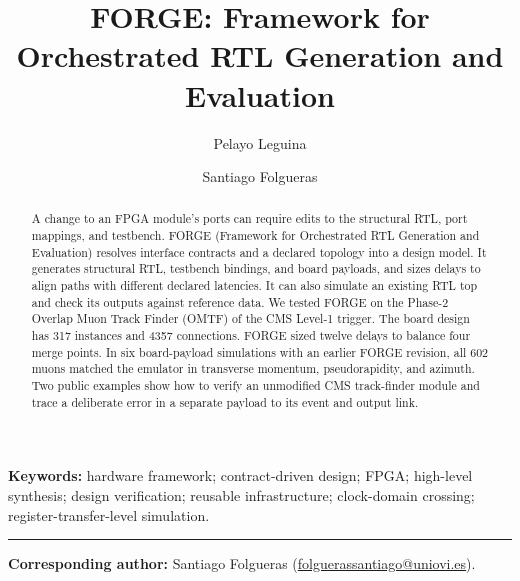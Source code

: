 \documentclass[10pt,a4paper]{article}
\title{\textbf{FORGE:} Framework for Orchestrated RTL Generation and Evaluation}
\author[1]{Pelayo Leguina}
\author[1]{Santiago Folgueras}
\affil[1]{Department of Physics, University of Oviedo, Oviedo, Spain}
\date{}
\begin{document}
\maketitle

\begin{abstract}
A change to an FPGA module's ports can require edits to the structural RTL, port mappings, and testbench. FORGE (Framework for Orchestrated RTL Generation and Evaluation) resolves interface contracts and a declared topology into a design model. It generates structural RTL, testbench bindings, and board payloads, and sizes delays to align paths with different declared latencies. It can also simulate an existing RTL top and check its outputs against reference data. We tested FORGE on the Phase-2 Overlap Muon Track Finder (OMTF) of the CMS Level-1 trigger. The board design has 317 instances and 4357 connections. FORGE sized twelve delays to balance four merge points. In six board-payload simulations with an earlier FORGE revision, all 602 muons matched the emulator in transverse momentum, pseudorapidity, and azimuth. Two public examples show how to verify an unmodified CMS track-finder module and trace a deliberate error in a separate payload to its event and output link.
\end{abstract}

\vspace{0.5em}
\noindent\textbf{Keywords:} hardware framework; contract-driven design; FPGA;
high-level synthesis; design verification; reusable infrastructure;
clock-domain crossing; register-transfer-level simulation.

\vspace{1em}
\noindent\rule{\linewidth}{0.4pt}
\small
\noindent\textbf{Corresponding author:} Santiago Folgueras
(\href{mailto:folguerassantiago@uniovi.es}{folguerassantiago@uniovi.es}).
\normalsize
\vspace{1em}








\end{document}
